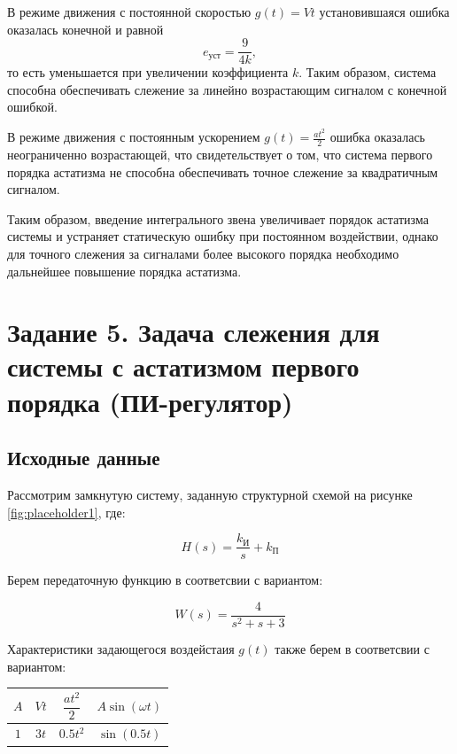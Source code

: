 \documentclass[a5paper, 10pt]{article}
\renewcommand{\arraystretch}{2} %
\theoremstyle{definition}
\theoremstyle{plain}
\theoremstyle{remark}
\begin{document}
В режиме движения с постоянной скоростью $g(t)=Vt$ установившаяся ошибка
оказалась конечной и равной
\[
e_{\text{уст}} = \frac{9}{4k},
\]
то есть уменьшается при увеличении коэффициента $k$.
Таким образом, система способна обеспечивать слежение за линейно
возрастающим сигналом с конечной ошибкой.

В режиме движения с постоянным ускорением $g(t)=\frac{at^2}{2}$ ошибка
оказалась неограниченно возрастающей, что свидетельствует о том,
что система первого порядка астатизма не способна обеспечивать
точное слежение за квадратичным сигналом.

Таким образом, введение интегрального звена увеличивает порядок астатизма
системы и устраняет статическую ошибку при постоянном воздействии,
однако для точного слежения за сигналами более высокого порядка
необходимо дальнейшее повышение порядка астатизма.


\newpage

\section{Задание 5. Задача слежения для системы с астатизмом первого порядка (ПИ-регулятор)}

\subsection{Исходные данные}

Рассмотрим замкнутую систему, заданную структурной схемой на рисунке \ref{fig:placeholder1}, где:

$$
H(s)=\dfrac{k_{\text{И}}}{s}+k_{\text{П}}
$$

Берем передаточную функцию в соответсвии с вариантом:

$$
W(s)=\dfrac{4}{s^2+s+3}
$$

Характеристики задающегося воздейстаия $g(t)$ также берем в соответсвии с вариантом:

\begin{table}[H]
    \centering
    \renewcommand{\arraystretch}{2} %
    \begin{tabular}{|c|c|c|c|}
    \hline
        $A$ & $Vt$ & $\dfrac{at^2}{2}$ & $A\sin(\omega t)$ \\[3pt] \hline
        $1$ & $3t$ & $0.5t^2$ & $\sin(0.5t)$ \\ \hline
    \end{tabular}
    \label{tab:placeholder}
\end{table}
\end{document}
